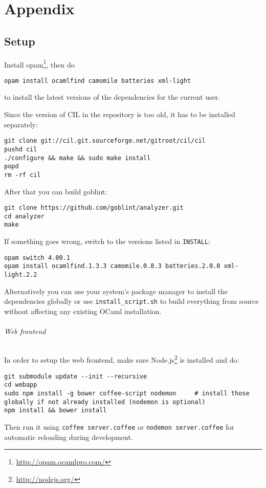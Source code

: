 \part*{Appendix}
\label{appendix}

\appendix %


\chapter{Setup}
\label{chap:app:setup}
Install opam\footnote{\url{http://opam.ocamlpro.com/}}, then do
\begin{lstlisting}
opam install ocamlfind camomile batteries xml-light
\end{lstlisting}
to install the latest versions of the dependencies for the current user.

Since the version of CIL in the repository is too old, it has to be installed separately:
\begin{lstlisting}
git clone git://cil.git.sourceforge.net/gitroot/cil/cil
pushd cil
./configure && make && sudo make install
popd
rm -rf cil
\end{lstlisting}
After that you can build goblint:

\begin{lstlisting}
git clone https://github.com/goblint/analyzer.git
cd analyzer
make
\end{lstlisting}
If something goes wrong, switch to the versions listed in \verb|INSTALL|:
\begin{lstlisting}
opam switch 4.00.1
opam install ocamlfind.1.3.3 camomile.0.8.3 batteries.2.0.0 xml-light.2.2
\end{lstlisting}
Alternatively you can use your system's package manager to install the dependencies globally or use \verb|install_script.sh| to build everything from source without affecting any existing OCaml installation.

\paragraph*{Web frontend}
In order to setup the web frontend, make sure Node.js\footnote{\url{http://nodejs.org/}} is installed and do:
\begin{lstlisting}
git submodule update --init --recursive
cd webapp
sudo npm install -g bower coffee-script nodemon     # install those globally if not already installed (nodemon is optional)
npm install && bower install
\end{lstlisting}
Then run it using \verb|coffee server.coffee| or \verb|nodemon server.coffee| for automatic reloading during development.

